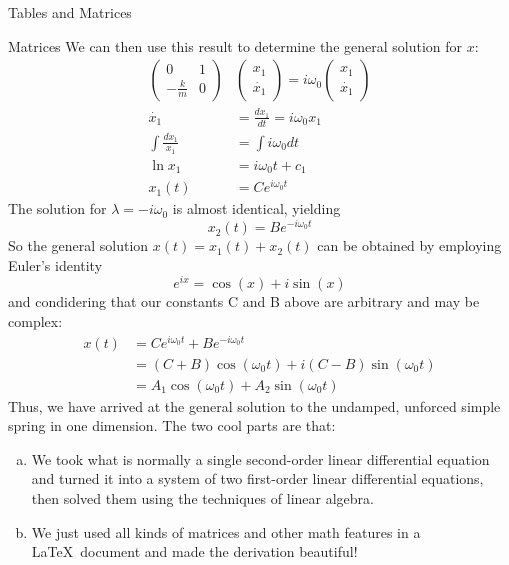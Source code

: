 \documentclass[onecolumn]{article}
\begin{document}
\begin{section}{Tables and Matrices}
\begin{subsection}{Matrices}
		We can then use this result to determine the general solution for $x$:
		\begin{align}
			\left(\begin{array}{cc}
				0 & 1 \\
				-\frac{k}{m} & 0
			\end{array}\right)&\left(\begin{array}{c}
				x_1 \\
				\dot{x_1}
			\end{array}\right) = i\omega_0\left(\begin{array}{c}
				x_1 \\
				\dot{x_1}
			\end{array}\right) \\
			\dot{x_1}&=\frac{dx_1}{dt}=i\omega_0{x_1}	\\
			\int\frac{dx_1}{x_1}&=\int{i\omega_0}dt \\
			\ln{x_1}&=i\omega_0{t}+c_1 \\
			x_1(t)&=Ce^{i\omega_0{t}}
		\end{align}
		The solution for \begin{math}\lambda=-i\omega_0\end{math} is almost identical, yielding
		\begin{equation}
			x_2(t)=Be^{-i\omega_0{t}}
		\end{equation}
		So the general solution $x(t)=x_1(t)+x_2(t)$ can be obtained by employing Euler's identity $$e^{ix}=\cos(x)+i\sin(x)$$ and condidering that our constants C and B above are arbitrary and may be complex:
		\begin{align}
			\label{eq:alignment}
			x(t)&=Ce^{i\omega_0{t}}+Be^{-i\omega_0{t}} \\
			&=(C+B)\cos(\omega_0{t})+i(C-B)\sin(\omega_0{t})\\
			&=A_1\cos(\omega_0{t})+A_2\sin(\omega_0{t})
		\end{align}
		Thus, we have arrived at the general solution to the undamped, unforced simple spring in one dimension. The two cool parts are that:
		\begin{enumerate}[a)]
			\item{We took what is normally a single second-order linear differential equation and turned it into a system of two first-order linear differential equations, then solved
				them using the techniques of linear algebra.}
			\item{We just used all kinds of matrices and other math features in a \LaTeX~document and made the derivation beautiful!}
		\end{enumerate}
	\end{subsection}
	

\end{section}
\end{document}
